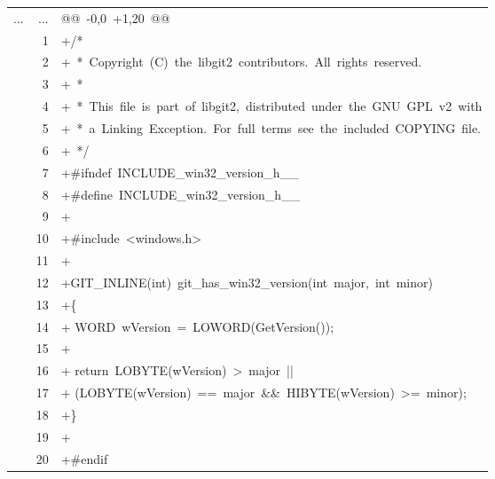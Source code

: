 {\ttfamily\scriptsize

\begin{longtabu} to 

\hline

... & ... & \textcolor{DiffLineNumber}{@@\ -0,0\ +1,20\ @@} \tabularnewline
& 1 &  +/* \tabularnewline
& 2 &  +\ *\ Copyright\ (C)\ the\ libgit2\ contributors.\ All\ rights\ reserved. \tabularnewline
& 3 &  +\ * \tabularnewline
& 4 &  +\ *\ This\ file\ is\ part\ of\ libgit2,\ distributed\ under\ the\ GNU\ GPL\ v2\ with \tabularnewline
& 5 &  +\ *\ a\ Linking\ Exception.\ For\ full\ terms\ see\ the\ included\ COPYING\ file. \tabularnewline
& 6 &  +\ */ \tabularnewline
& 7 &  +\#ifndef\ INCLUDE\_win32\_version\_h\_\_ \tabularnewline
& 8 &  +\#define\ INCLUDE\_win32\_version\_h\_\_ \tabularnewline
& 9 &  + \tabularnewline
& 10 &  +\#include\ <windows.h> \tabularnewline
& 11 &  + \tabularnewline
& 12 &  +GIT\_INLINE(int)\ git\_has\_win32\_version(int\ major,\ int\ minor) \tabularnewline
& 13 &  +\{ \tabularnewline
& 14 &  +	WORD\ wVersion\ =\ LOWORD(GetVersion()); \tabularnewline
& 15 &  + \tabularnewline
& 16 &  +	return\ LOBYTE(wVersion)\ >\ major\ || \tabularnewline
& 17 &  +		(LOBYTE(wVersion)\ ==\ major\ \&\&\ HIBYTE(wVersion)\ >=\ minor); \tabularnewline
& 18 &  +\} \tabularnewline
& 19 &  + \tabularnewline
& 20 &  +\#endif \tabularnewline

\hline
\end{longtabu}
}
